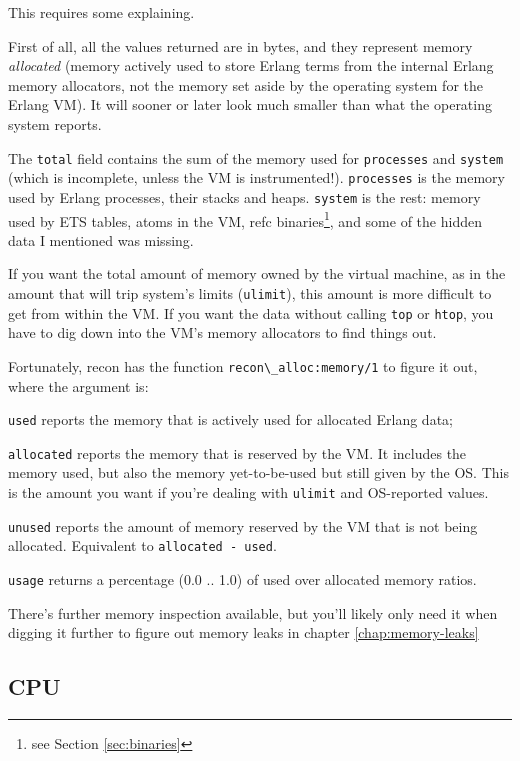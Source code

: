 \documentclass[11pt, oneside]{book}   	%
\newcommand{\app}[1]{\Verb`#1`}
\newcommand{\function}[1]{\Verb`#1`}
\newcommand{\expression}[1]{\Verb`#1`}
\begin{document}
This requires some explaining.

First of all, all the values returned are in bytes, and they represent memory \emph{allocated} (memory actively used to store Erlang terms from the internal Erlang memory allocators, not the memory set aside by the operating system for the Erlang VM). It will sooner or later look much smaller than what the operating system reports.

The \expression{total} field contains the sum of the memory used for \expression{processes} and \expression{system} (which is incomplete, unless the VM is instrumented!). \expression{processes} is the memory used by Erlang processes, their stacks and heaps. \expression{system} is the rest: memory used by ETS tables, atoms in the VM, refc binaries\footnote{see Section \ref{sec:binaries}}, and some of the hidden data I mentioned was missing.

If you want the total amount of memory owned by the virtual machine, as in the amount that will trip system's limits (\app{ulimit}), this amount is more difficult to get from within the VM. If you want the data without calling \app{top} or \app{htop}, you have to dig down into the VM's memory allocators to find things out.

Fortunately, recon has the function \function{recon\_alloc:memory/1} to figure it out, where the argument is:

\begin{itemize*}
	\item \expression{used} reports the memory that is actively used for allocated Erlang data;
   	\item \expression{allocated} reports the memory that is reserved by the VM. It includes the memory used, but also the memory yet-to-be-used but still given by the OS. This is the amount you want if you're dealing with \app{ulimit} and OS-reported values.
	\item \expression{unused} reports the amount of memory reserved by the VM that is not being allocated. Equivalent to \expression{allocated - used}.
	\item \expression{usage} returns a percentage (0.0 .. 1.0) of used over allocated memory ratios.
\end{itemize*}

There's further memory inspection available, but you'll likely only need it when digging it further to figure out memory leaks in chapter \ref{chap:memory-leaks}

\subsection{CPU}
\end{document}
